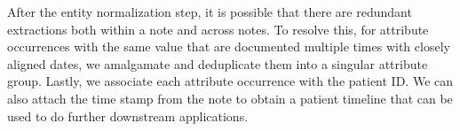 After the entity normalization step, it is possible that there are redundant extractions both within a note and across notes. To resolve this, for attribute occurrences with the same value that are documented multiple times with closely aligned dates, we amalgamate and deduplicate them into a singular attribute group. Lastly, we associate each attribute occurrence with the patient ID. We can also attach the time stamp from the note to obtain a patient timeline that can be used to do further downstream applications.









































































    




































